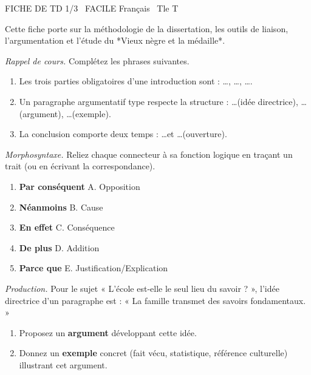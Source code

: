 \documentclass[11pt]{article}
\begin{document}
\begin{tcolorbox}[enhanced,colback=popink,colframe=popink,arc=10pt,boxrule=0pt,left=12pt,right=12pt,top=9pt,bottom=9pt]
{\color{white}\popxbold\small FICHE DE TD 1/3 \textbullet\ FACILE \hfill Français \textbullet\ Tle T\par}
\end{tcolorbox}
\vspace{4pt}
Cette fiche porte sur la méthodologie de la dissertation, les outils de liaison, l'argumentation et l'étude du *Vieux nègre et la médaille*.

\begin{exercice}
\emph{Rappel de cours.} Complétez les phrases suivantes.
\begin{enumerate}
    \item Les trois parties obligatoires d'une introduction sont : \ldots, \ldots, \ldots.
    \item Un paragraphe argumentatif type respecte la structure : \ldots (idée directrice), \ldots (argument), \ldots (exemple).
    \item La conclusion comporte deux temps : \ldots et \ldots (ouverture).
\end{enumerate}
\end{exercice}

\begin{exercice}
\emph{Morphosyntaxe.} Reliez chaque connecteur à sa fonction logique en traçant un trait (ou en écrivant la correspondance).
\begin{enumerate}
    \item \textbf{Par conséquent} \hfill A. Opposition
    \item \textbf{Néanmoins} \hfill B. Cause
    \item \textbf{En effet} \hfill C. Conséquence
    \item \textbf{De plus} \hfill D. Addition
    \item \textbf{Parce que} \hfill E. Justification/Explication
\end{enumerate}
\end{exercice}

\begin{exercice}
\emph{Production.} Pour le sujet « L'école est-elle le seul lieu du savoir ? », l'idée directrice d'un paragraphe est : « La famille transmet des savoirs fondamentaux. »
\begin{enumerate}
    \item Proposez un \textbf{argument} développant cette idée.
    \item Donnez un \textbf{exemple} concret (fait vécu, statistique, référence culturelle) illustrant cet argument.
\end{enumerate}
\end{exercice}
\end{document}
